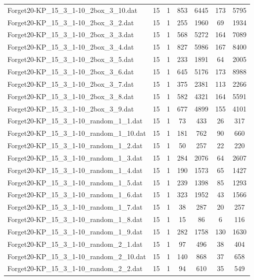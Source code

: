 \begin{table}[!ht]
\begin{tabular}{lcccccc}
Forget20-KP\_15\_3\_1-10\_2box\_3\_10.dat & 15 & 1 & 853 & 6445 & 173 & 5795 \\
Forget20-KP\_15\_3\_1-10\_2box\_3\_2.dat & 15 & 1 & 255 & 1960 & 69 & 1934 \\
Forget20-KP\_15\_3\_1-10\_2box\_3\_3.dat & 15 & 1 & 568 & 5272 & 164 & 7089 \\
Forget20-KP\_15\_3\_1-10\_2box\_3\_4.dat & 15 & 1 & 827 & 5986 & 167 & 8400 \\
Forget20-KP\_15\_3\_1-10\_2box\_3\_5.dat & 15 & 1 & 233 & 1891 & 64 & 2005 \\
Forget20-KP\_15\_3\_1-10\_2box\_3\_6.dat & 15 & 1 & 645 & 5176 & 173 & 8988 \\
Forget20-KP\_15\_3\_1-10\_2box\_3\_7.dat & 15 & 1 & 375 & 2381 & 113 & 2266 \\
Forget20-KP\_15\_3\_1-10\_2box\_3\_8.dat & 15 & 1 & 582 & 4321 & 164 & 5591 \\
Forget20-KP\_15\_3\_1-10\_2box\_3\_9.dat & 15 & 1 & 677 & 4899 & 155 & 4101 \\
Forget20-KP\_15\_3\_1-10\_random\_1\_1.dat & 15 & 1 & 73 & 433 & 26 & 317 \\
Forget20-KP\_15\_3\_1-10\_random\_1\_10.dat & 15 & 1 & 181 & 762 & 90 & 660 \\
Forget20-KP\_15\_3\_1-10\_random\_1\_2.dat & 15 & 1 & 50 & 257 & 22 & 220 \\
Forget20-KP\_15\_3\_1-10\_random\_1\_3.dat & 15 & 1 & 284 & 2076 & 64 & 2607 \\
Forget20-KP\_15\_3\_1-10\_random\_1\_4.dat & 15 & 1 & 190 & 1573 & 65 & 1427 \\
Forget20-KP\_15\_3\_1-10\_random\_1\_5.dat & 15 & 1 & 239 & 1398 & 85 & 1293 \\
Forget20-KP\_15\_3\_1-10\_random\_1\_6.dat & 15 & 1 & 323 & 1952 & 43 & 1566 \\
Forget20-KP\_15\_3\_1-10\_random\_1\_7.dat & 15 & 1 & 38 & 287 & 20 & 257 \\
Forget20-KP\_15\_3\_1-10\_random\_1\_8.dat & 15 & 1 & 15 & 86 & 6 & 116 \\
Forget20-KP\_15\_3\_1-10\_random\_1\_9.dat & 15 & 1 & 282 & 1758 & 130 & 1630 \\
Forget20-KP\_15\_3\_1-10\_random\_2\_1.dat & 15 & 1 & 97 & 496 & 38 & 404 \\
Forget20-KP\_15\_3\_1-10\_random\_2\_10.dat & 15 & 1 & 140 & 868 & 37 & 658 \\
Forget20-KP\_15\_3\_1-10\_random\_2\_2.dat & 15 & 1 & 94 & 610 & 35 & 549 \\

\end{tabular}
\end{table}
